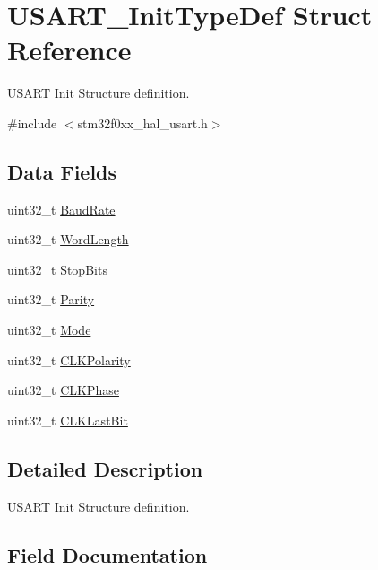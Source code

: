 \hypertarget{struct_u_s_a_r_t___init_type_def}{}\section{U\+S\+A\+R\+T\+\_\+\+Init\+Type\+Def Struct Reference}
\label{struct_u_s_a_r_t___init_type_def}


U\+S\+A\+RT Init Structure definition.  




{\ttfamily \#include $<$stm32f0xx\+\_\+hal\+\_\+usart.\+h$>$}

\subsection*{Data Fields}
\begin{DoxyCompactItemize}
\item 
uint32\+\_\+t \hyperlink{struct_u_s_a_r_t___init_type_def_aaad609733f3fd8146c8745e953a91b2a}{Baud\+Rate}
\item 
uint32\+\_\+t \hyperlink{struct_u_s_a_r_t___init_type_def_ae5e60b9a021fe0009588fc86c7584a5a}{Word\+Length}
\item 
uint32\+\_\+t \hyperlink{struct_u_s_a_r_t___init_type_def_a8394ba239444e3e5fe1ada1c37cb1019}{Stop\+Bits}
\item 
uint32\+\_\+t \hyperlink{struct_u_s_a_r_t___init_type_def_a1d60a99b8f3965f01ab23444b154ba79}{Parity}
\item 
uint32\+\_\+t \hyperlink{struct_u_s_a_r_t___init_type_def_a0ffc93ec511ed9cf1663f6939bd3e839}{Mode}
\item 
uint32\+\_\+t \hyperlink{struct_u_s_a_r_t___init_type_def_a83f278c9d173d3cd021644692bf3c435}{C\+L\+K\+Polarity}
\item 
uint32\+\_\+t \hyperlink{struct_u_s_a_r_t___init_type_def_aba7183911cbc41063270dab182de768f}{C\+L\+K\+Phase}
\item 
uint32\+\_\+t \hyperlink{struct_u_s_a_r_t___init_type_def_abf58d9d3c7c5f08ad9624410d22d04c8}{C\+L\+K\+Last\+Bit}
\end{DoxyCompactItemize}


\subsection{Detailed Description}
U\+S\+A\+RT Init Structure definition. 

\subsection{Field Documentation}
\mbox{\label{struct_u_s_a_r_t___init_type_def_aaad609733f3fd8146c8745e953a91b2a}} 
